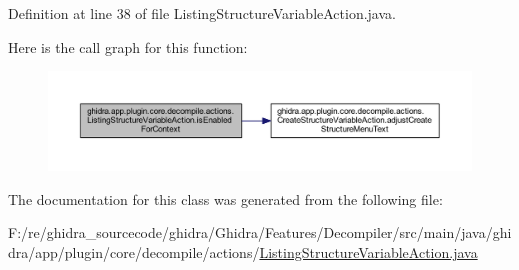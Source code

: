 Definition at line 38 of file Listing\+Structure\+Variable\+Action.\+java.

Here is the call graph for this function\+:
\nopagebreak
\begin{figure}[H]
\begin{center}
\leavevmode
\includegraphics[width=350pt]{classghidra_1_1app_1_1plugin_1_1core_1_1decompile_1_1actions_1_1_listing_structure_variable_action_a0f5a8d5621741704fa1101274dfe091f_cgraph}
\end{center}
\end{figure}


The documentation for this class was generated from the following file\+:\begin{DoxyCompactItemize}
\item 
F\+:/re/ghidra\+\_\+sourcecode/ghidra/\+Ghidra/\+Features/\+Decompiler/src/main/java/ghidra/app/plugin/core/decompile/actions/\mbox{\hyperlink{_listing_structure_variable_action_8java}{Listing\+Structure\+Variable\+Action.\+java}}\end{DoxyCompactItemize}
